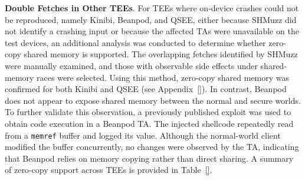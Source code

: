 {\bf Double Fetches in Other TEEs}.
For TEEs where on-device crashes could not be reproduced, namely Kinibi, Beanpod, and QSEE, either because SHMuzz did not identify a crashing input or because the affected TAs were unavailable on the test devices, an additional analysis was conducted to determine whether zero-copy shared memory is supported.
The overlapping fetches identified by SHMuzz were manually examined, and those with observable side effects under shared-memory races were selected. Using this method, zero-copy shared memory was confirmed for both Kinibi and QSEE (see Appendix~\ref{}). In contrast, Beanpod does not appear to expose shared memory between the normal and secure worlds.
To further validate this observation, a previously published exploit was used to obtain code execution in a Beanpod TA. The injected shellcode repeatedly read from a {\tt memref} buffer and logged its value. Although the normal-world client modified the buffer concurrently, no changes were observed by the TA, indicating that Beanpod relies on memory copying rather than direct sharing. A summary of zero-copy support across TEEs is provided in Table~\ref{}.